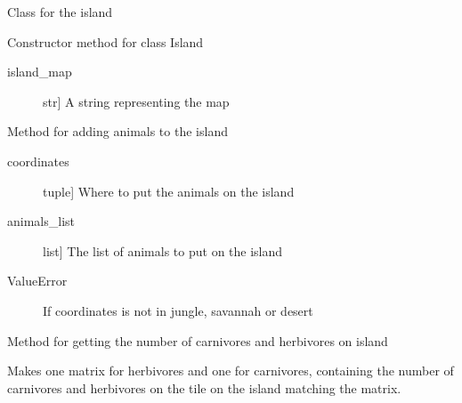 \documentclass[a4paper,10pt,english]{sphinxmanual}
\begin{document}
\begin{fulllineitems}
\label{\detokenize{island:biosim.island.Island}}
Class for the island

Constructor method for class Island
\begin{description}
\item[{island\_map}] \leavevmode{[}str{]}
A string representing the map

\end{description}

\begin{fulllineitems}
\label{\detokenize{island:biosim.island.Island.add_animal_island}}
Method for adding animals to the island
\begin{description}
\item[{coordinates}] \leavevmode{[}tuple{]}
Where to put the animals on the island

\item[{animals\_list}] \leavevmode{[}list{]}
The list of animals to put on the island

\end{description}
\begin{description}
\item[{ValueError}] \leavevmode
If coordinates is not in jungle, savannah or desert

\end{description}

\end{fulllineitems}


\begin{fulllineitems}
\label{\detokenize{island:biosim.island.Island.animals_on_island}}
Method for getting the number of carnivores and herbivores on island

Makes one matrix for herbivores and one for carnivores, containing
the number of carnivores and herbivores on the tile on the island
matching the matrix.

\end{fulllineitems}



\end{fulllineitems}
\end{document}
